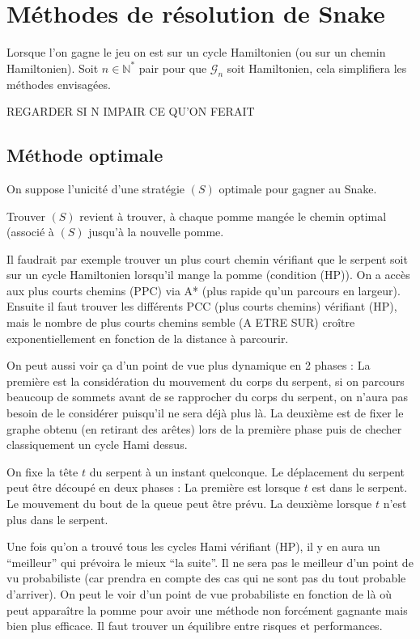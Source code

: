 \documentclass[french,a4paper]{article}
\begin{document}
\section{Méthodes de résolution de Snake}

Lorsque l'on gagne le jeu on est sur un cycle Hamiltonien (ou sur un chemin Hamiltonien). Soit $n \in \mathbb{N}^*$ pair pour que $\mathcal{G}_n$ soit Hamiltonien, cela simplifiera les méthodes envisagées.

REGARDER SI N IMPAIR CE QU'ON FERAIT

\subsection{Méthode optimale}
On suppose l'unicité d'une stratégie $(S)$ optimale pour gagner au Snake.

Trouver $(S)$ revient à trouver, à chaque pomme mangée le chemin optimal (associé à $(S)$ jusqu'à la nouvelle pomme.

\medskip

Il faudrait par exemple trouver un plus court chemin vérifiant que le serpent soit sur un cycle Hamiltonien lorsqu'il mange la pomme (condition (HP)). On a accès aux plus courts chemins (PPC) via A* (plus rapide qu'un parcours en largeur). Ensuite il faut trouver les différents PCC (plus courts chemins) vérifiant (HP), mais le nombre de plus courts chemins semble (A ETRE SUR) croître exponentiellement en fonction de la distance à parcourir.

On peut aussi voir ça d'un point de vue plus dynamique en 2 phases : La première est la considération du mouvement du corps du serpent, si on parcours beaucoup de sommets avant de se rapprocher du corps du serpent, on n'aura pas besoin de le considérer puisqu'il ne sera déjà plus là. La deuxième est de fixer le graphe obtenu (en retirant des arêtes) lors de la première phase puis de checher classiquement un cycle Hami dessus.

On fixe la tête $t$ du serpent à un instant quelconque. Le déplacement du serpent peut être découpé en deux phases :
La première est lorsque $t$ est dans le serpent. Le mouvement du bout de la queue peut être prévu.
La deuxième lorsque $t$ n'est plus dans le serpent.

Une fois qu'on a trouvé tous les cycles Hami vérifiant (HP), il y en aura un ``meilleur'' qui prévoira le mieux ``la suite''. Il ne sera pas le meilleur d'un point de vu probabiliste (car prendra en compte des cas qui ne sont pas du tout probable d'arriver). On peut le voir d'un point de vue probabiliste en fonction de là où peut apparaître la pomme pour avoir une méthode non forcément gagnante mais bien plus efficace. Il faut trouver un équilibre entre risques et performances.
\end{document}
